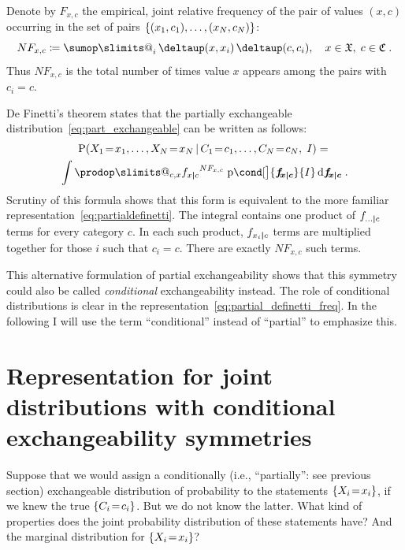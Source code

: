 \documentclass[\ifafour a4paper,12pt,\else a5paper,10pt,\fi%
onecolumn,oneside,article,%
british%
]{memoir}
\makeatletter
\theoremstyle{remark}
\theoremstyle{innote}
\def\sum{\DOTSI\sumop\slimits@}
\def\prod{\DOTSI\prodop\slimits@}
\newcommand*{\delt}{\deltaup}%
\newcommand*{\di}{\mathrm{d}}%
\newcommand*{\defd}{\coloneqq}
\DeclarePairedDelimiter\set{\{}{\}}
\newcommand*{\pf}{\mathrm{p}}%
\newcommand*{\p}{\mathrm{P}}%
\renewcommand*{\|}[1][]{\nonscript\,#1\vert\nonscript\,\mathopen{}}
\newcommand*{\ie}{{i.e.}}
\newcommand*{\tsum}{\mathop{\textstyle\sum}\nolimits}
\renewcommand*{\=}{\TextOrMath\texteq\eq}
\newcommand*{\X}[1]{X_{#1}}
\newcommand*{\x}[1]{x_{#1}}
\newcommand*{\C}[1]{C_{#1}}
\newcommand*{\cc}[1]{c_{#1}}
\newcommand*{\sX}{\mathfrak{X}}
\newcommand*{\sC}{\mathfrak{C}}
\newcommand*{\fxc}{\bm{f_{\!x\bcond c}}}
\newcommand*{\bcond}[1][]{\nonscript\,#1\bm{\vert}\nonscript\;\mathopen{}}
\makeatother
\begin{document}
Denote by $F_{x,c}$ the empirical, joint relative frequency of the pair of
values $(x,c)$ occurring in the set of pairs
$\set{(\x{1}, \cc{1}), \dotsc, (\x{N}, \cc{N})}$:
\begin{equation}
  \label{eq:rel_frequencies}
  N F_{x,c} \defd \tsum_{i}\delt(x, \x{i})\,\delt(c, \cc{i}),
  \quad x \in \sX,\; c \in \sC \;.
\end{equation}
Thus $N F_{x,c}$ is the total number of times value $x$ appears among the
pairs with $\cc{i}=c$.

De Finetti’s theorem states that the partially exchangeable
distribution~\eqref{eq:part_exchangeable} can be written as follows:
\begin{multline}
  \label{eq:partial_definetti_freq}
    \p( \X{1}\=\x{1}, \dotsc,  \X{N}\=\x{N} \|
    \C{1}\=\cc{1}, \dotsc,\C{N}\=\cc{N},\;  I) ={}\\
\int\prod_{c,x} {f_{x \bcond c}}^{N F_{x, c}}\;
\pf\cond[\big]{\fxc}{I} \,\di\fxc \;.
\end{multline}
Scrutiny of this formula shows that this form is equivalent to the more
familiar representation~\eqref{eq:partialdefinetti}. The integral contains
one product of $f_{\dotso \bcond c}$ terms for every category $c$. In each
such product, $f_{\x{i} \bcond c}$ terms are multiplied together for those
$i$ such that $\cc{i}=c$. There are exactly $N F_{x,c}$ such terms.

This alternative formulation of partial exchangeability shows that this
symmetry could also be called \emph{conditional} exchangeability instead.
The role of conditional distributions is clear in the
representation~\eqref{eq:partial_definetti_freq}. In the following I will
use the term \enquote{conditional} instead of \enquote{partial} to
emphasize this.


\section{Representation for joint distributions with conditional
exchangeability  symmetries}
\label{sec:result}

Suppose that we would assign a conditionally (\ie, \enquote{partially}: see
previous section) exchangeable distribution of probability to the
statements $\set{\X{i}\=\x{i}}$, if we knew the true $\set{\C{i}\=\cc{i}}$.
But we do not know the latter. What kind of properties does the joint
probability distribution of these statements have? And the marginal
distribution for $\set{\X{i}\=\x{i}}$?
\end{document}
